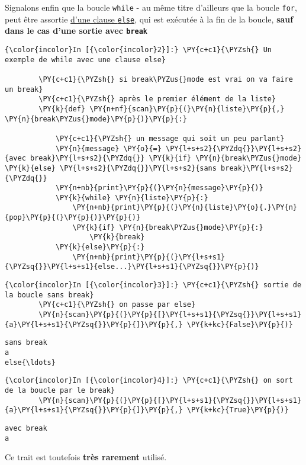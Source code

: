     Signalons enfin que la boucle \texttt{while} - au même titre d'ailleurs
que la boucle \texttt{for}, peut être assortie
\href{https://docs.python.org/3/reference/compound_stmts.html\#the-while-statement}{d'une
clause \texttt{else}}, qui est exécutée à la fin de la boucle,
\textbf{sauf dans le cas d'une sortie avec \texttt{break}}

    \begin{Verbatim}[commandchars=\\\{\}]
{\color{incolor}In [{\color{incolor}2}]:} \PY{c+c1}{\PYZsh{} Un exemple de while avec une clause else}
        
        \PY{c+c1}{\PYZsh{} si break\PYZus{}mode est vrai on va faire un break}
        \PY{c+c1}{\PYZsh{} après le premier élément de la liste}
        \PY{k}{def} \PY{n+nf}{scan}\PY{p}{(}\PY{n}{liste}\PY{p}{,} \PY{n}{break\PYZus{}mode}\PY{p}{)}\PY{p}{:}
        
            \PY{c+c1}{\PYZsh{} un message qui soit un peu parlant}
            \PY{n}{message} \PY{o}{=} \PY{l+s+s2}{\PYZdq{}}\PY{l+s+s2}{avec break}\PY{l+s+s2}{\PYZdq{}} \PY{k}{if} \PY{n}{break\PYZus{}mode} \PY{k}{else} \PY{l+s+s2}{\PYZdq{}}\PY{l+s+s2}{sans break}\PY{l+s+s2}{\PYZdq{}}
            \PY{n+nb}{print}\PY{p}{(}\PY{n}{message}\PY{p}{)}
            \PY{k}{while} \PY{n}{liste}\PY{p}{:}
                \PY{n+nb}{print}\PY{p}{(}\PY{n}{liste}\PY{o}{.}\PY{n}{pop}\PY{p}{(}\PY{p}{)}\PY{p}{)}
                \PY{k}{if} \PY{n}{break\PYZus{}mode}\PY{p}{:}
                    \PY{k}{break}
            \PY{k}{else}\PY{p}{:}
                \PY{n+nb}{print}\PY{p}{(}\PY{l+s+s1}{\PYZsq{}}\PY{l+s+s1}{else...}\PY{l+s+s1}{\PYZsq{}}\PY{p}{)}
\end{Verbatim}


    \begin{Verbatim}[commandchars=\\\{\}]
{\color{incolor}In [{\color{incolor}3}]:} \PY{c+c1}{\PYZsh{} sortie de la boucle sans break}
        \PY{c+c1}{\PYZsh{} on passe par else}
        \PY{n}{scan}\PY{p}{(}\PY{p}{[}\PY{l+s+s1}{\PYZsq{}}\PY{l+s+s1}{a}\PY{l+s+s1}{\PYZsq{}}\PY{p}{]}\PY{p}{,} \PY{k+kc}{False}\PY{p}{)}
\end{Verbatim}


    \begin{Verbatim}[commandchars=\\\{\}]
sans break
a
else{\ldots}

    \end{Verbatim}

    \begin{Verbatim}[commandchars=\\\{\}]
{\color{incolor}In [{\color{incolor}4}]:} \PY{c+c1}{\PYZsh{} on sort de la boucle par le break}
        \PY{n}{scan}\PY{p}{(}\PY{p}{[}\PY{l+s+s1}{\PYZsq{}}\PY{l+s+s1}{a}\PY{l+s+s1}{\PYZsq{}}\PY{p}{]}\PY{p}{,} \PY{k+kc}{True}\PY{p}{)}
\end{Verbatim}


    \begin{Verbatim}[commandchars=\\\{\}]
avec break
a

    \end{Verbatim}

    Ce trait est toutefois \textbf{très rarement} utilisé.


    
    
    
